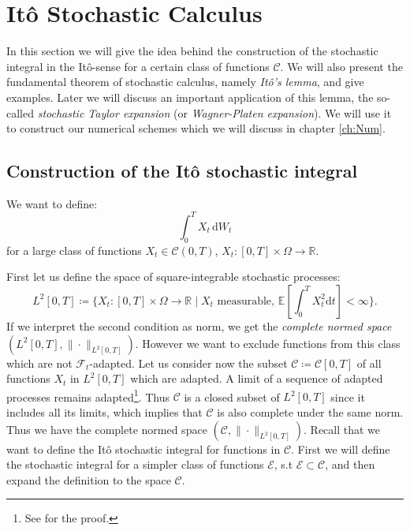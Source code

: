 \chapter{It\^o Stochastic Calculus}
\label{ch:ItoCalc}
In this section we will give the idea behind the construction of the stochastic integral in the It\^o-sense for a certain class of functions \(\mathcal{C}\).
We will also present the fundamental theorem of stochastic calculus, namely \emph{It\^o's lemma}, and give examples. Later we will discuss an important application of this lemma, the so-called \emph{stochastic Taylor expansion} (or \emph{Wagner-Platen expansion}). We will use it to construct our numerical schemes which we will discuss in chapter \ref{ch:Num}.
\section{Construction of the It\^o stochastic integral}
We want to define:
\[\int_0^T \! X_t \, \mathrm{d}W_{t}\]
for a large class of functions \(X_t\in\mathcal{C}(0,T)\), \(X_t\!:[0,T]\!\times\Omega\rightarrow\mathbb{R}\).

First let us define the space of square-integrable stochastic processes:
\[L^{2}[0,T] \coloneqq \{X_t\!: [0,T]\times\Omega \rightarrow \mathbb{R}\mid X_t \text{ measurable},\, \mathbb{E}[\int^{T}_{0}X_t^2\mathrm{d}t]<\infty\}.\]
If we interpret the second condition as norm, we get the \emph{complete normed space} \((L^{2}[0,T], \|\cdot\|_{L^2[0,T]})\).
However we want to exclude functions from this class which are not \(\mathcal{F}_t\)-adapted.
Let us consider now the subset \(\mathcal{C}\coloneqq\mathcal{C}[0,T]\) of all functions \(X_t\) in \(L^{2}[0,T]\) which are adapted.
A limit of a sequence of adapted processes remains adapted\footnote{See \cite{BMKaratzas} for the proof.}. Thus \(\mathcal{C}\) is a closed subset of \(L^2[0,T]\) since it includes all its limits, which implies that \(\mathcal{C}\) is also complete under the same norm. Thus we have the complete normed space \((\mathcal{C}, \|\cdot\|_{L^2[0,T]})\). Recall that we want to define the It\^o stochastic integral for functions in \(\mathcal{C}\). 
First we will define the stochastic integral for a simpler class of functions \(\mathcal{E}\), s.t \(\mathcal{E}\subset\mathcal{C}\), and then expand the definition to the space \(\mathcal{C}\).

